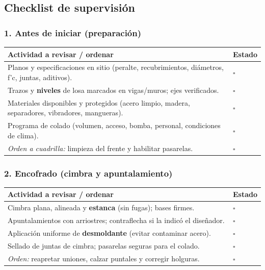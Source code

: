 \documentclass[12pt]{article}
\newcommand{\cbox}{\(\square\)}
\renewcommand{\cbox}{\(\square\)} %
\begin{document}
 \subsection{Checklist de supervisión}
 
 \subsubsection*{1. Antes de iniciar (preparación)}
 \begin{tabularx}{\linewidth}{>{\raggedright\arraybackslash}p{0.93\linewidth} >{\centering\arraybackslash}m{0.07\linewidth}}
 	\toprule
 	\textbf{Actividad a revisar / ordenar} & \textbf{Estado}\\
 	\midrule
 	Planos y especificaciones en sitio (peralte, recubrimientos, diámetros, f'c, juntas, aditivos). & \cbox \\
 	Trazos y \textbf{niveles} de losa marcados en vigas/muros; ejes verificados. & \cbox \\
 	Materiales disponibles y protegidos (acero limpio, madera, separadores, vibradores, mangueras). & \cbox \\
 	Programa de colado (volumen, acceso, bomba, personal, condiciones de clima). & \cbox \\
 	\textit{Orden a cuadrilla:} limpieza del frente y habilitar pasarelas. & \cbox \\
 	\bottomrule
 \end{tabularx}
 
 \subsubsection*{2. Encofrado (cimbra y apuntalamiento)}
 \begin{tabularx}{\linewidth}{>{\raggedright\arraybackslash}p{0.93\linewidth} >{\centering\arraybackslash}m{0.07\linewidth}}
 	\toprule
 	\textbf{Actividad a revisar / ordenar} & \textbf{Estado}\\
 	\midrule
 	Cimbra plana, alineada y \textbf{estanca} (sin fugas); bases firmes. & \cbox \\
 	Apuntalamientos con arriostres; contraflecha si la indicó el diseñador. & \cbox \\
 	Aplicación uniforme de \textbf{desmoldante} (evitar contaminar acero). & \cbox \\
 	Sellado de juntas de cimbra; pasarelas seguras para el colado. & \cbox \\
 	\textit{Orden:} reapretar uniones, calzar puntales y corregir holguras. & \cbox \\
 	\bottomrule
 \end{tabularx}
 
\end{document}
